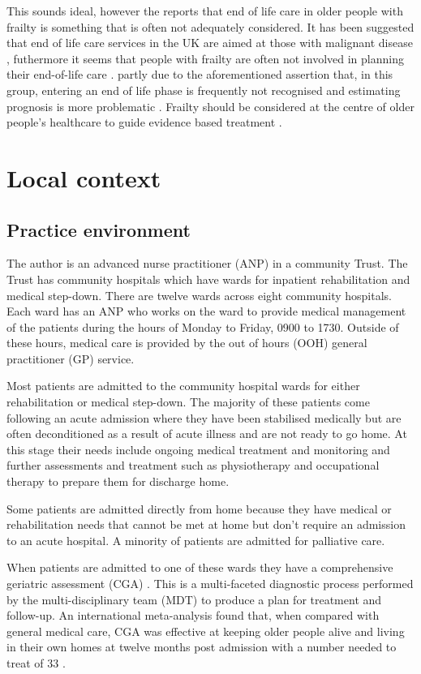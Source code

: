 \documentclass
[
	12pt,
	a4paper,
	oneside,
]{report}
\begin{document}
This sounds ideal, however the \textcite{silver:12} reports that end of life care 
in older people with frailty
is something that is often not adequately considered. It has been suggested that 
end of life care services in the UK are aimed at those with malignant 
disease \parencite{sharp:13}, futhermore it seems that people with frailty 
are often not involved in planning their 
end-of-life care \textcite{oliver:14}. partly due to the aforementioned assertion 
that, in this group, entering an end of life phase is frequently not recognised 
\textcite{wallington:16} and
estimating prognosis is more problematic \parencite{silver:12}.
Frailty should be considered at the centre of older people's healthcare to guide
evidence based treatment \parencite{woo:14}.

\section{Local context}

\subsection{Practice environment}
\label{sec:local-practice}
The author is an advanced nurse practitioner (ANP) in a community Trust.
The Trust has community hospitals which have wards for inpatient rehabilitation and
medical step-down. There are twelve wards across eight community hospitals. Each ward has
an ANP who works on the ward to provide medical management of the patients during 
the hours of Monday to Friday, 0900 to 1730. Outside of these hours, medical care 
is provided by the out of hours (OOH) general practitioner (GP) service. 

Most patients are admitted to the community hospital wards for either rehabilitation
or medical step-down. The majority of these patients come following an acute admission
where they have been stabilised medically but are often deconditioned as a result
of acute illness and are not ready to go home. At this stage their needs include 
ongoing medical treatment and monitoring and further assessments and treatment such 
as physiotherapy and occupational therapy to prepare them for discharge home.

Some patients are admitted directly from home because they have medical or rehabilitation
needs that cannot be met at home but don't require an admission to an acute hospital.
A minority of patients are admitted for palliative care.

When patients are admitted to one of these wards they have a comprehensive geriatric 
assessment (CGA) \parencite{bgs:14}. This is a multi-faceted diagnostic process
performed by the multi-disciplinary team (MDT) to produce a plan for treatment 
and follow-up.
An international meta-analysis found that, when compared with general medical care,
CGA was effective at keeping older people alive and living in their own homes at
twelve months post admission with a number needed to treat of 33 \parencite{ellis:11}.
\end{document}
